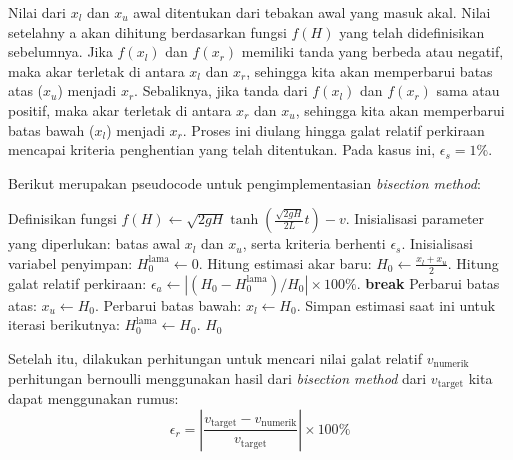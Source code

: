 \documentclass[conference]{IEEEtran}
\begin{document}
Nilai dari $x_l$ dan $x_u$ awal ditentukan dari tebakan awal yang masuk akal. Nilai setelahny a akan dihitung berdasarkan fungsi $f(H)$ yang telah didefinisikan sebelumnya. Jika $f(x_l)$ dan $f(x_r)$ memiliki tanda yang berbeda atau negatif, maka akar terletak di antara $x_l$ dan $x_r$, sehingga kita akan memperbarui batas atas ($x_u$) menjadi $x_r$. Sebaliknya, jika tanda dari $f(x_l)$ dan $f(x_r)$ sama atau positif, maka akar terletak di antara $x_r$ dan $x_u$, sehingga kita akan memperbarui batas bawah ($x_l$) menjadi $x_r$. Proses ini diulang hingga galat relatif perkiraan mencapai kriteria penghentian yang telah ditentukan. Pada kasus ini, $\epsilon_s = 1\%$. 

Berikut merupakan pseudocode untuk pengimplementasian \textit{bisection method}:
\begin{flushleft}
\begin{algorithmic}[1]
    \State Definisikan fungsi $f(H) \gets \sqrt{2gH} \tanh\left(\frac{\sqrt{2gH}}{2L}t\right) - v$.
    \State Inisialisasi parameter yang diperlukan: batas awal $x_l$ dan $x_u$, serta kriteria berhenti $\epsilon_s$.
    \State Inisialisasi variabel penyimpan: $H_0^{\text{lama}} \gets 0$.
        \State Hitung estimasi akar baru: $H_0 \gets \frac{x_l + x_u}{2}$.
        \State Hitung galat relatif perkiraan: $\epsilon_a \gets \left| (H_0 - H_0^{\text{lama}}) / H_0 \right| \times 100\%$.
            \State \textbf{break}
        \EndIf
            \State Perbarui batas atas: $x_u \gets H_0$.
        \Else
            \State Perbarui batas bawah: $x_l \gets H_0$.
        \EndIf
        \State Simpan estimasi saat ini untuk iterasi berikutnya: $H_0^{\text{lama}} \gets H_0$.
    \EndWhile
    \State \Return $H_0$
\end{algorithmic}
\end{flushleft}

Setelah itu, dilakukan perhitungan untuk mencari nilai galat relatif $v_\text{numerik}$ perhitungan bernoulli menggunakan hasil dari \textit{bisection method} dari $v_\text{target}$ kita dapat menggunakan rumus:
\begin{equation}
\epsilon_r = \left| \frac{v_{\text{target}} - v_{\text{numerik}}}{v_{\text{target}}} \right| \times 100\%
\end{equation}
\end{document}
